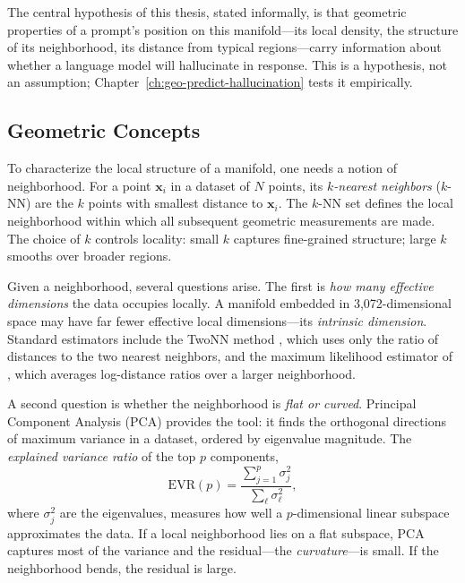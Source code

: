 The central hypothesis of this thesis, stated informally, is that geometric properties of a prompt's position on this manifold---its local density, the structure of its neighborhood, its distance from typical regions---carry information about whether a language model will hallucinate in response. This is a hypothesis, not an assumption; Chapter~\ref{ch:geo-predict-hallucination} tests it empirically.

\subsection{Geometric Concepts}
\label{sec:bg-geometric-concepts}

To characterize the local structure of a manifold, one needs a notion of neighborhood. For a point $\mathbf{x}_i$ in a dataset of $N$ points, its \emph{$k$-nearest neighbors} ($k$-NN) are the $k$ points with smallest distance to $\mathbf{x}_i$. The $k$-NN set defines the local neighborhood within which all subsequent geometric measurements are made. The choice of $k$ controls locality: small $k$ captures fine-grained structure; large $k$ smooths over broader regions.

Given a neighborhood, several questions arise. The first is \emph{how many effective dimensions} the data occupies locally. A manifold embedded in 3,072-dimensional space may have far fewer effective local dimensions---its \emph{intrinsic dimension}. Standard estimators include the TwoNN method \citep{facco2017twonn}, which uses only the ratio of distances to the two nearest neighbors, and the maximum likelihood estimator of \citet{levina2004maximum}, which averages log-distance ratios over a larger neighborhood.

A second question is whether the neighborhood is \emph{flat or curved}. Principal Component Analysis (PCA) provides the tool: it finds the orthogonal directions of maximum variance in a dataset, ordered by eigenvalue magnitude. The \emph{explained variance ratio} of the top $p$ components,
\begin{equation}
\text{EVR}(p) = \frac{\sum_{j=1}^{p} \sigma_j^2}{\sum_{\ell} \sigma_\ell^2},
\label{eq:evr}
\end{equation}
where $\sigma_j^2$ are the eigenvalues, measures how well a $p$-dimensional linear subspace approximates the data. If a local neighborhood lies on a flat subspace, PCA captures most of the variance and the residual---the \emph{curvature}---is small. If the neighborhood bends, the residual is large.


